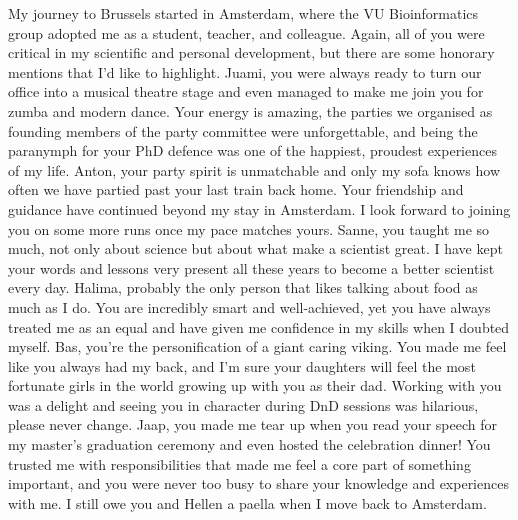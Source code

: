 My journey to Brussels started in Amsterdam, where the VU Bioinformatics group adopted me as a student, teacher, and colleague. Again, all of you were critical in my scientific and personal development, but there are some honorary mentions that I'd like to highlight. Juami, you were always ready to turn our office into a musical theatre stage and even managed to make me join you for zumba and modern dance. Your energy is amazing, the parties we organised as founding members of the party committee were unforgettable, and being the paranymph for your PhD defence was one of the happiest, proudest experiences of my life. Anton, your party spirit is unmatchable and only my sofa knows how often we have partied past your last train back home. Your friendship and guidance have continued beyond my stay in Amsterdam. I look forward to joining you on some more runs once my pace matches yours. Sanne, you taught me so much, not only about science but about what make a scientist great. I have kept your words and lessons very present all these years to become a better scientist every day. Halima, probably the only person that likes talking about food as much as I do. You are incredibly smart and well-achieved, yet you have always treated me as an equal and have given me confidence in my skills when I doubted myself. Bas, you're the personification of a giant caring viking. You made me feel like you always had my back, and I'm sure your daughters will feel the most fortunate girls in the world growing up with you as their dad. Working with you was a delight and seeing you in character during DnD sessions was hilarious, please never change. Jaap, you made me tear up when you read your speech for my master's graduation ceremony and even hosted the celebration dinner! You trusted me with responsibilities that made me feel a core part of something important, and you were never too busy to share your knowledge and experiences with me. I still owe you and Hellen a paella when I move back to Amsterdam. 

